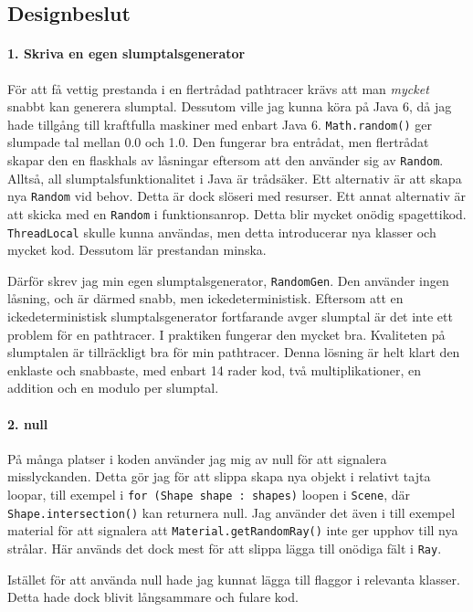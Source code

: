 \documentclass{article}
\begin{document}
\subsection{Designbeslut}
\paragraph{1. Skriva en egen slumptalsgenerator}
För att få vettig prestanda i en flertrådad pathtracer krävs att man
\emph{mycket} snabbt kan generera slumptal. Dessutom ville jag kunna
köra på Java 6, då jag hade tillgång till kraftfulla maskiner med
enbart Java 6. \texttt{Math.random()} ger slumpade tal mellan 0.0 och
1.0. Den fungerar bra entrådat, men flertrådat skapar den en flaskhals
av låsningar eftersom att den använder sig av \texttt{Random}. Alltså,
all slumptalsfunktionalitet i Java är trådsäker. Ett alternativ är att
skapa nya \texttt{Random} vid behov. Detta är dock slöseri med
resurser. Ett annat alternativ är att skicka med en \texttt{Random} i
funktionsanrop. Detta blir mycket onödig
spagettikod. \texttt{ThreadLocal} skulle kunna användas, men detta
introducerar nya klasser och mycket kod. Dessutom lär prestandan
minska.

Därför skrev jag min egen slumptalsgenerator, \texttt{RandomGen}. Den
använder ingen låsning, och är därmed snabb, men
ickedeterministisk. Eftersom att en ickedeterministisk
slumptalsgenerator fortfarande avger slumptal är det inte ett problem
för en pathtracer. I praktiken fungerar den mycket bra. Kvaliteten på
slumptalen är tillräckligt bra för min pathtracer. Denna lösning är
helt klart den enklaste och snabbaste, med enbart 14 rader kod, två
multiplikationer, en addition och en modulo per slumptal.

\paragraph{2. null}
På många platser i koden använder jag mig av null för att signalera
misslyckanden. Detta gör jag för att slippa skapa nya objekt i
relativt tajta loopar, till exempel i \texttt{for (Shape shape :
  shapes)} loopen i \texttt{Scene}, där \texttt{Shape.intersection()}
kan returnera null. Jag använder det även i till exempel material för
att signalera att \texttt{Material.getRandomRay()} inte ger upphov
till nya strålar. Här används det dock mest för att slippa lägga till
onödiga fält i \texttt{Ray}.

Istället för att använda null hade jag kunnat lägga till flaggor i
relevanta klasser. Detta hade dock blivit långsammare och fulare kod.
\end{document}
